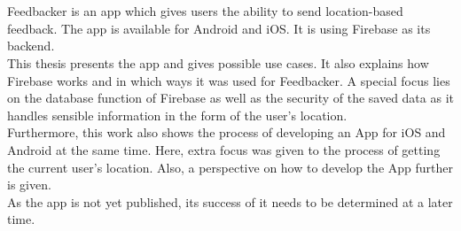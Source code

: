 \section*{}
Feedbacker is an app which gives users the ability to send location-based feedback. The app is available for Android and iOS. It is using Firebase as its backend.\\
This thesis presents the app and gives possible use cases. It also explains how Firebase works and in which ways it was used for Feedbacker. A special focus lies on the database function of Firebase as well as the security of the saved data as it handles sensible information in the form of the user's location.\\
Furthermore, this work also shows the process of developing an App for iOS and Android at the same time. Here, extra focus was given to the process of getting the current user's location. Also, a perspective on how to develop the App further is given.\\
As the app is not yet published, its success of it needs to be determined at a later time.
